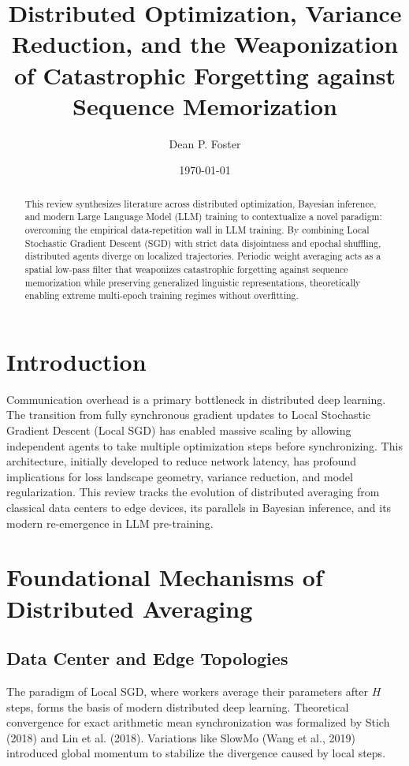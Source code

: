 \documentclass[11pt]{article}
\title{\textbf{Distributed Optimization, Variance Reduction, and the Weaponization of Catastrophic Forgetting against Sequence Memorization}}
\author{Dean P. Foster}
\date{\today}
\begin{document}
\maketitle

\begin{abstract}
This review synthesizes literature across distributed optimization, Bayesian inference, and modern Large Language Model (LLM) training to contextualize a novel paradigm: overcoming the empirical data-repetition wall in LLM training. By combining Local Stochastic Gradient Descent (SGD) with strict data disjointness and epochal shuffling, distributed agents diverge on localized trajectories. Periodic weight averaging acts as a spatial low-pass filter that weaponizes catastrophic forgetting against sequence memorization while preserving generalized linguistic representations, theoretically enabling extreme multi-epoch training regimes without overfitting.
\end{abstract}

\section{Introduction}
Communication overhead is a primary bottleneck in distributed deep learning. The transition from fully synchronous gradient updates to Local Stochastic Gradient Descent (Local SGD) has enabled massive scaling by allowing independent agents to take multiple optimization steps before synchronizing. This architecture, initially developed to reduce network latency, has profound implications for loss landscape geometry, variance reduction, and model regularization. This review tracks the evolution of distributed averaging from classical data centers to edge devices, its parallels in Bayesian inference, and its modern re-emergence in LLM pre-training.

\section{Foundational Mechanisms of Distributed Averaging}
\subsection{Data Center and Edge Topologies}
The paradigm of Local SGD, where workers average their parameters after $H$ steps, forms the basis of modern distributed deep learning. Theoretical convergence for exact arithmetic mean synchronization was formalized by Stich (2018) and Lin et al. (2018). Variations like SlowMo (Wang et al., 2019) introduced global momentum to stabilize the divergence caused by local steps.
\end{document}
